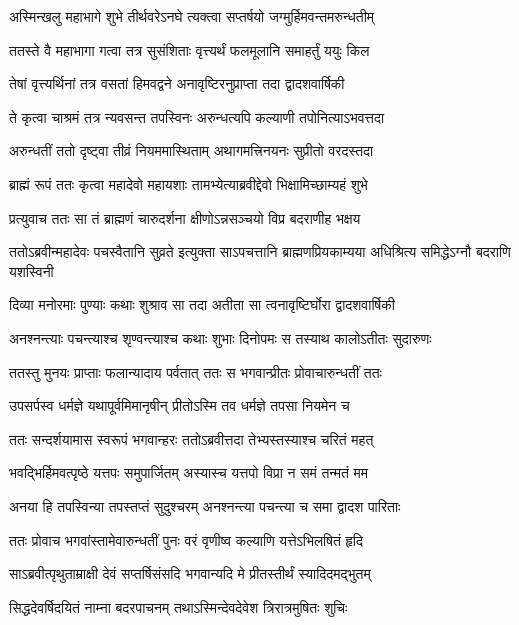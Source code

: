 \twolineshloka
{अस्मिन्खलु महाभागे शुभे तीर्थवरेऽनघे}
{त्यक्त्वा सप्तर्षयो जग्मुर्हिमवन्तमरुन्धतीम्}


\twolineshloka
{ततस्ते वै महाभागा गत्वा तत्र सुसंशिताः}
{वृत्त्यर्थं फलमूलानि समाहर्तुं ययुः किल}


\twolineshloka
{तेषां वृत्त्यर्थिनां तत्र वसतां हिमवद्वने}
{अनावृष्टिरनुप्राप्ता तदा द्वादशवार्षिकी}


\twolineshloka
{ते कृत्वा चाश्रमं तत्र न्यवसन्त तपस्विनः}
{अरुन्धत्यपि कल्याणी तपोनित्याऽभवत्तदा}


\twolineshloka
{अरुन्धतीं ततो दृष्ट्वा तीव्रं नियममास्थिताम्}
{अथागमत्त्रिनयनः सुप्रीतो वरदस्तदा}


\twolineshloka
{ब्राह्मं रूपं ततः कृत्वा महादेवो महायशाः}
{तामभ्येत्याब्रवीद्देवो भिक्षामिच्छाम्यहं शुभे}


\twolineshloka
{प्रत्युवाच ततः सा तं ब्राह्मणं चारुदर्शना}
{क्षीणोऽन्नसञ्चयो विप्र बदराणीह भक्षय}


\threelineshloka
{ततोऽब्रवीन्महादेवः पचस्वैतानि सुव्रते}
{इत्युक्ता साऽपचत्तानि ब्राह्मणप्रियकाम्यया}
{अधिश्रित्य समिद्धेऽग्नौ बदराणि यशस्विनी}


\twolineshloka
{दिव्या मनोरमाः पुण्याः कथाः शुश्राव सा तदा}
{अतीता सा त्वनावृष्टिर्घोरा द्वादशवार्षिकी}


\twolineshloka
{अनश्नन्त्याः पचन्त्याश्च शृण्वन्त्याश्च कथाः शुभाः}
{दिनोपमः स तस्याथ कालोऽतीतः सुदारुणः}


\twolineshloka
{ततस्तु मुनयः प्राप्ताः फलान्यादाय पर्वतात्}
{ततः स भगवान्प्रीतः प्रोवाचारुन्धतीं ततः}


\twolineshloka
{उपसर्पस्व धर्मज्ञे यथापूर्वमिमानृषीन्}
{प्रीतोऽस्मि तव धर्मज्ञे तपसा नियमेन च}


\twolineshloka
{ततः सन्दर्शयामास स्वरूपं भगवान्हरः}
{ततोऽब्रवीत्तदा तेभ्यस्तस्याश्च चरितं महत्}


\twolineshloka
{भवद्भिर्हिमवत्पृष्ठे यत्तपः समुपार्जितम्}
{अस्यास्च यत्तपो विप्रा न समं तन्मतं मम}


\twolineshloka
{अनया हि तपस्विन्या तपस्तप्तं सुदुश्चरम्}
{अनश्नन्त्या पचन्त्या च समा द्वादश पारिताः}


\twolineshloka
{ततः प्रोवाच भगवांस्तामेवारुन्धतीं पुनः}
{वरं वृणीष्व कल्याणि यत्तेऽभिलषितं हृदि}


\twolineshloka
{साऽब्रवीत्पृथुताम्राक्षी देवं सप्तर्षिसंसदि}
{भगवान्यदि मे प्रीतस्तीर्थं स्यादिदमद्भुतम्}


\twolineshloka
{सिद्धदेवर्षिदयितं नाम्ना बदरपाचनम्}
{तथाऽस्मिन्देवदेवेश त्रिरात्रमुषितः शुचिः}


